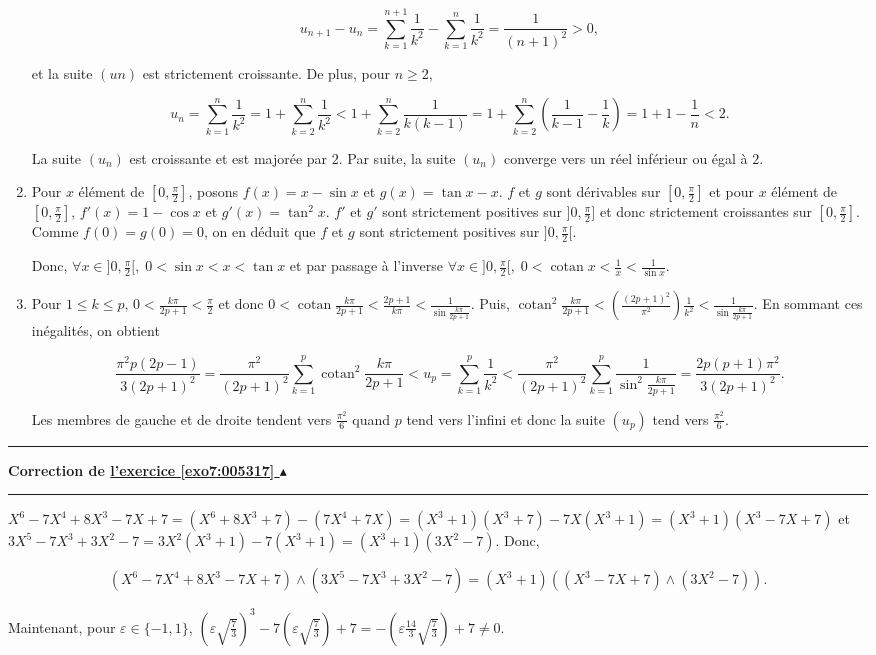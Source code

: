 \documentclass[11pt,a4paper]{article}
\newcommand{\cotan}{\mathop{\mathrm{cotan}}\nolimits}
\newcounter{exo}
\newcommand{\correction}[1]{\hypertarget{cor7:#1}{}\label{cor7:#1}{\bf Correction de \hyperlink{exo7:#1}{l'exercice \ref{exo7:#1} $\blacktriangle$}}\vspace{1mm}\hrule\vspace{1mm}}
\newcommand{\fincorrection}{\vspace{1mm}\hrule\vspace*{7mm}}
\begin{document}
\begin{enumerate}
$$u_{n+1}-u_n=\sum_{k=1}^{n+1}\frac{1}{k^2}-\sum_{k=1}^{n}\frac{1}{k^2}=\frac{1}{(n+1)^2}>0,$$

et la suite $(un)$ est strictement croissante. De plus, pour $n\geq2$,
 
$$u_n=\sum_{k=1}^{n}\frac{1}{k^2}=1+\sum_{k=2}^{n}\frac{1}{k^2}<1+\sum_{k=2}^{n}\frac{1}{k(k-1)}=1+\sum_{k=2}^{n}(\frac{1}{k-1}-\frac{1}{k})=1+1-\frac{1}{n}<2.$$

La suite $(u_n)$ est croissante et est majorée par $2$. Par suite, la suite $(u_n)$ converge vers un réel inférieur ou égal à $2$.

\item  Pour $x$ élément de $[0,\frac{\pi}{2}]$, posons $f(x)=x-\sin x$ et $g(x)=\tan x-x$.
$f$ et $g$ sont dérivables sur $[0,\frac{\pi}{2}]$ et pour $x$ élément de $[0,\frac{\pi}{2}]$, $f'(x)=1-\cos x$ et $g'(x)=\tan^2x$. $f'$ et $g'$ sont strictement positives sur $]0,\frac{\pi}{2}]$ et donc strictement croissantes sur $[0,\frac{\pi}{2}]$. Comme $f(0)=g(0)=0$, on en déduit que $f$ et $g$ sont strictement positives sur $]0,\frac{\pi}{2}[$.

Donc, $\forall x\in]0,\frac{\pi}{2}[,\;0<\sin x<x<\tan x$ et par passage à l'inverse $\forall x\in]0,\frac{\pi}{2}[,\;0<\cotan x<\frac{1}{x}<\frac{1}{\sin x}$.

\item  Pour $1\leq k\leq p$, $0<\frac{k\pi}{2p+1}<\frac{\pi}{2}$  et donc $0<\cotan\frac{k\pi}{2p+1}<\frac{2p+1}{k\pi}<\frac{1}{\sin\frac{k\pi}{2p+1}}$. Puis, $\cotan^2\frac{k\pi}{2p+1}<(\frac{(2p+1)^2}{\pi^2})\frac{1}{k^2}<\frac{1}{\sin\frac{k\pi}{2p+1}}$. En sommant ces inégalités, on obtient

$$\frac{\pi^2p(2p-1)}{3(2p+1)^2}=\frac{\pi^2}{(2p+1)^2}\sum_{k=1}^{p}\cotan^2\frac{k\pi}{2p+1}<u_p=\sum_{k=1}^{p}
\frac{1}{k^2}<\frac{\pi^2}{(2p+1)^2}\sum_{k=1}^{p}\frac{1}{\sin^2\frac{k\pi}{2p+1}}=\frac{2p(p+1)\pi^2}{3(2p+1)^2}.$$

Les membres de gauche et de droite tendent vers $\frac{\pi^2}{6}$ quand $p$ tend vers l'infini et donc la suite $(u_p)$ tend vers $\frac{\pi^2}{6}$.
\end{enumerate}
\fincorrection
\correction{005317}
$X^6-7X^4+8X^3-7X+7=(X^6+8X^3+7)-(7X^4+7X)=(X^3+1)(X^3+7)-7X(X^3+1)=(X^3+1)(X^3-7X+7)$ et $3X^5-7X^3+3X^2-7=3X^2(X^3+1)-7(X^3+1)=(X^3+1)(3X^2-7)$. Donc,

$$(X^6-7X^4+8X^3-7X+7)\wedge(3X^5-7X^3+3X^2-7)=(X^3+1)((X^3-7X+7)\wedge(3X^2-7)).$$

Maintenant, pour $\varepsilon\in\{-1,1\}$, $(\varepsilon\sqrt{\frac{7}{3}})^3-7(\varepsilon\sqrt{\frac{7}{3}})+7=-(\varepsilon\frac{14}{3}\sqrt{\frac{7}{3}})+7\neq0$.
\end{document}
